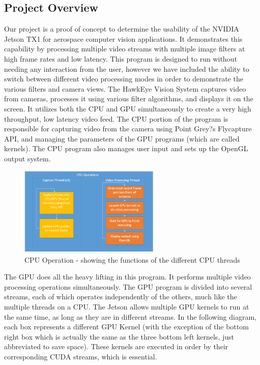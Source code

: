 \subsection{Project Overview}
Our project is a proof of concept to determine the usability of the NVIDIA Jetson TX1 for aerospace computer vision applications.  It demonstrates this capability by processing multiple video streams with multiple image filters at high frame rates and low latency. This program is designed to run without needing any interaction from the user, however we have included the ability to switch between different video processing modes in order to demonstrate the various filters and camera views.
The HawkEye Vision System captures video from cameras, processes it using various filter algorithms, and displays it on the screen. It utilizes both the CPU and GPU simultaneously to create a very high throughput, low latency video feed. The CPU portion of the program is responsible for capturing video from the camera using Point Grey?s Flycapture API, and managing the parameters of the GPU programs (which are called kernels). The CPU program also manages user input and sets up the OpenGL output system. 

\begin{figure}[H] 
	\centering
	\includegraphics[width=0.6\textwidth,natwidth=610,natheight=642]{images/CPU.png} 
	\caption{CPU Operation - showing the functions of the different CPU threads}  
	\end{figure}
	
The GPU does all the heavy lifting in this program. It performs multiple video processing operations simultaneously. The GPU program is divided into several streams, each of which operates independently of the others, much like the multiple threads on a CPU. The Jetson allows multiple GPU kernels to run at the same time, as long as they are in different streams.
In the following diagram, each box represents a different GPU Kernel (with the exception of the bottom right box which is actually the same as the three bottom left kernels, just abbreviated to save space). These kernels are executed in order by their corresponding CUDA streams, which is essential. 
	
